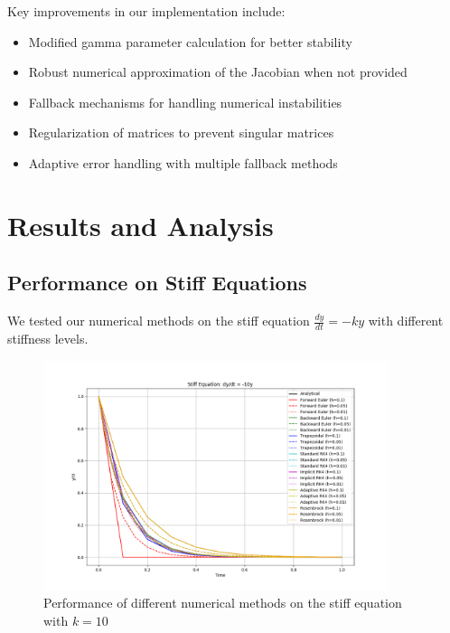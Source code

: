 \documentclass[11pt,a4paper]{article}
\begin{document}
Key improvements in our implementation include:
\begin{itemize}
    \item Modified gamma parameter calculation for better stability
    \item Robust numerical approximation of the Jacobian when not provided
    \item Fallback mechanisms for handling numerical instabilities
    \item Regularization of matrices to prevent singular matrices
    \item Adaptive error handling with multiple fallback methods
\end{itemize}

\section{Results and Analysis}

\subsection{Performance on Stiff Equations}

We tested our numerical methods on the stiff equation $\frac{dy}{dt} = -ky$ with different stiffness levels.

\begin{figure}[H]
    \centering
    \includegraphics[width=0.9\textwidth]{stiff_equation_k10.png}
    \caption{Performance of different numerical methods on the stiff equation with $k=10$}
    \label{fig:k10}
\end{figure}
\end{document}
